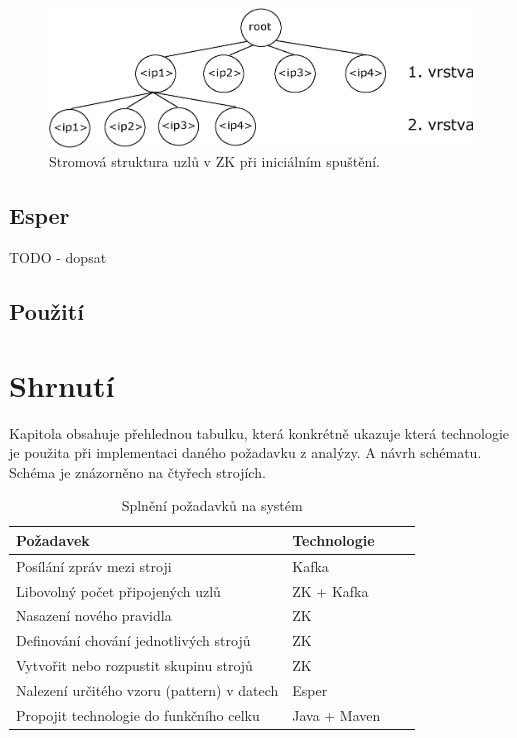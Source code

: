 \documentclass[
  digital, %
  table,   %
  nolof,     %
  nolot,     %
  oneside, %
  nocover,
  monochrome,
  12pt
]{fithesis3}
\begin{document}
\begin{figure}[H]
	\centering
    \includegraphics[width=1\textwidth, height=0.22\textheight]{images/zookeeper-impl.eps}
    \caption{Stromová struktura uzlů v ZK při iniciálním spuštění.}
    \label{fig:zookeeper-impl}
\end{figure}

\subsection{Esper}
\label{sec:esper}
TODO - dopsat

\subsection*{Použití}

\section{Shrnutí}
Kapitola obsahuje přehlednou tabulku, která konkrétně ukazuje která technologie je použita při implementaci daného požadavku z analýzy. A návrh schématu. Schéma je znázorněno na čtyřech strojích.

\begin{table}[H]
  \centering
  \begin{tabularx}{\textwidth}{lllX}
    \toprule
    Požadavek & Technologie \\
    \midrule
    Posílání zpráv mezi stroji & Kafka \\
    Libovolný počet připojených uzlů & ZK + Kafka \\
    Nasazení nového pravidla & ZK \\
    Definování chování jednotlivých strojů & ZK \\
    Vytvořit nebo rozpustit skupinu strojů & ZK \\
    Nalezení určitého vzoru (pattern) v datech & Esper \\
    Propojit technologie do funkčního celku & Java + Maven \\
    \bottomrule
  \end{tabularx}
  \caption{Splnění požadavků na systém}
  \label{tab:fulfill-usecases}
\end{table}
\end{document}
